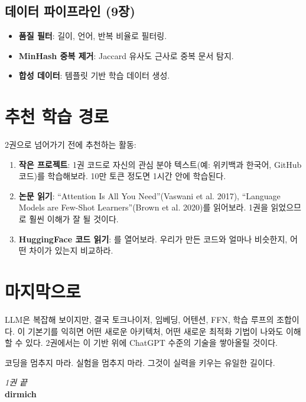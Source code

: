 \subsection{데이터 파이프라인 (9장)}

\begin{itemize}
  \item \textbf{품질 필터}: 길이, 언어, 반복 비율로 필터링.
  \item \textbf{MinHash 중복 제거}: Jaccard 유사도 근사로 중복 문서 탐지.
  \item \textbf{합성 데이터}: 템플릿 기반 학습 데이터 생성.
\end{itemize}

\section{추천 학습 경로}

2권으로 넘어가기 전에 추천하는 활동:

\begin{enumerate}
  \item \textbf{작은 프로젝트}: 1권 코드로 자신의 관심 분야 텍스트(예: 위키백과 한국어, GitHub 코드)를 학습해보라. 10만 토큰 정도면 1시간 안에 학습된다.
  \item \textbf{논문 읽기}: ``Attention Is All You Need''(Vaswani et al. 2017), ``Language Models are Few-Shot Learners''(Brown et al. 2020)를 읽어보라. 1권을 읽었으므로 훨씬 이해가 잘 될 것이다.
  \item \textbf{HuggingFace 코드 읽기}: 를 열어보라. 우리가 만든 코드와 얼마나 비슷한지, 어떤 차이가 있는지 비교하라.
\end{enumerate}

\section{마지막으로}

LLM은 복잡해 보이지만, 결국 토크나이저, 임베딩, 어텐션, FFN, 학습 루프의 조합이다. 이 기본기를 익히면 어떤 새로운 아키텍처, 어떤 새로운 최적화 기법이 나와도 이해할 수 있다. 2권에서는 이 기반 위에 ChatGPT 수준의 기술을 쌓아올릴 것이다.

코딩을 멈추지 마라. 실험을 멈추지 마라. 그것이 실력을 키우는 유일한 길이다.

\begin{flushright}
\textit{1권 끝}\\[0.5em]
\textbf{dirmich}
\end{flushright}
